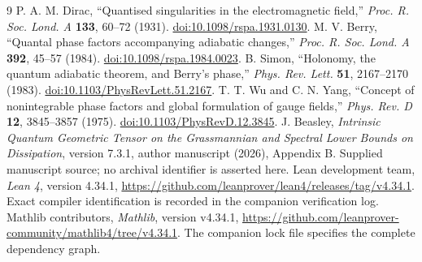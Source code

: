 \documentclass[11pt]{article}
\theoremstyle{definition}\newtheorem{definition}[theorem]{Definition}
\theoremstyle{remark}\newtheorem{remark}[theorem]{Remark}
\begin{document}
\clearpage
\begin{thebibliography}{9}
 P. A. M. Dirac, ``Quantised singularities in the electromagnetic field,'' \emph{Proc. R. Soc. Lond. A} \textbf{133}, 60--72 (1931). \href{https://doi.org/10.1098/rspa.1931.0130}{doi:10.1098/rspa.1931.0130}.
 M. V. Berry, ``Quantal phase factors accompanying adiabatic changes,'' \emph{Proc. R. Soc. Lond. A} \textbf{392}, 45--57 (1984). \href{https://doi.org/10.1098/rspa.1984.0023}{doi:10.1098/rspa.1984.0023}.
 B. Simon, ``Holonomy, the quantum adiabatic theorem, and Berry's phase,'' \emph{Phys. Rev. Lett.} \textbf{51}, 2167--2170 (1983). \href{https://doi.org/10.1103/PhysRevLett.51.2167}{doi:10.1103/PhysRevLett.51.2167}.
 T. T. Wu and C. N. Yang, ``Concept of nonintegrable phase factors and global formulation of gauge fields,'' \emph{Phys. Rev. D} \textbf{12}, 3845--3857 (1975). \href{https://doi.org/10.1103/PhysRevD.12.3845}{doi:10.1103/PhysRevD.12.3845}.
 J. Beasley, \emph{Intrinsic Quantum Geometric Tensor on the Grassmannian and Spectral Lower Bounds on Dissipation}, version 7.3.1, author manuscript (2026), Appendix B. Supplied manuscript source; no archival identifier is asserted here.
 Lean development team, \emph{Lean 4}, version 4.34.1, \url{https://github.com/leanprover/lean4/releases/tag/v4.34.1}. Exact compiler identification is recorded in the companion verification log.
 Mathlib contributors, \emph{Mathlib}, version v4.34.1, \url{https://github.com/leanprover-community/mathlib4/tree/v4.34.1}. The companion lock file specifies the complete dependency graph.
\end{thebibliography}
\end{document}
